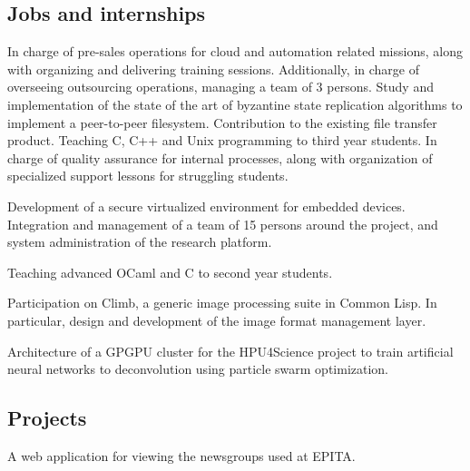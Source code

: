 \documentclass[10pt,a4paper,sans]{moderncv} %
\begin{document}
\subsection{Jobs and internships}

{In charge of pre-sales operations for cloud and automation related missions, along with organizing and delivering training sessions. Additionally, in charge of overseeing outsourcing operations, managing a team of 3 persons.}
{Study and implementation of the state of the art of byzantine state replication algorithms to implement a peer-to-peer filesystem. Contribution to the existing file transfer product.}
{Teaching C, C++ and Unix programming to third year students. In charge of quality assurance for internal processes, along with organization of specialized support lessons for struggling students.}

{Development of a secure virtualized environment for embedded devices. Integration and management of a team of 15 persons around the project, and system administration of the research platform.}

{Teaching advanced OCaml and C to second year students.}

{Participation on Climb, a generic image processing suite in Common Lisp. In particular, design and development of the image format management layer.}

{Architecture of a GPGPU cluster for the HPU4Science project to train artificial neural networks to deconvolution
using particle swarm optimization.}

\subsection{Projects}


{A web application for viewing the newsgroups used at EPITA.}
\end{document}
